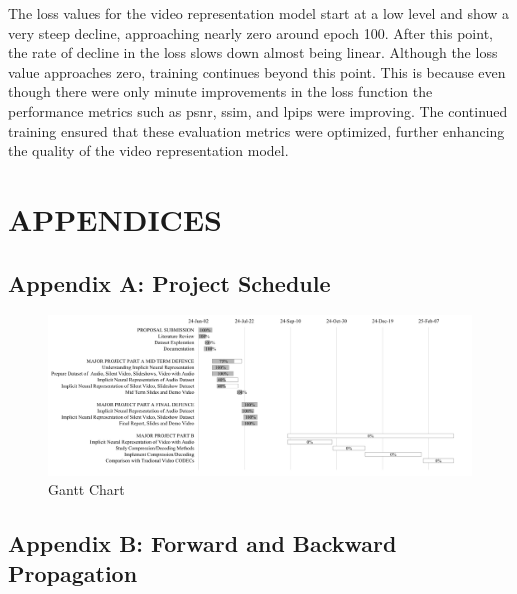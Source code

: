 \documentclass{ioereport}
\begin{document}
    The loss values for the video representation model start at a low level and show a very steep decline, approaching nearly zero around epoch 100. After this point, the rate of decline in the loss slows down almost being linear. Although the loss value approaches zero, training continues beyond this point. This is because even though there were only minute improvements in the loss function the performance metrics such as \gls{psnr}, \gls{ssim}, and \gls{lpips} were improving. The continued training ensured that these evaluation metrics were optimized, further enhancing the quality of the video representation model.
    
    \pagebreak


\section{\MakeUppercase{Appendices}}
    \subsection*{Appendix A: Project Schedule}
    \begin{figure}[H]
        \centering
        \includegraphics[angle=90, origin=c, height=0.6\textheight]{assets/Gantt.png}
        \caption{Gantt Chart}
        \label{fig:gantt}
    \end{figure}
    
\pagebreak

\subsection*{Appendix B: Forward and Backward Propagation}
\label{app:forward-backward-eqn}
\end{document}
